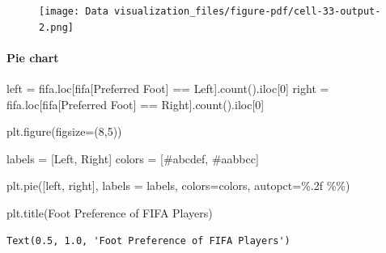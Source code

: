 \documentclass[
  letterpaper,
  DIV=11,
  numbers=noendperiod]{scrreprt}
\let\oldparagraph\paragraph
\renewcommand{\paragraph}[1]{\oldparagraph{#1}\mbox{}}
\newenvironment{Shaded}{\begin{snugshade}}{\end{snugshade}}
\newcommand{\DecValTok}[1]{\textcolor[rgb]{0.68,0.00,0.00}{#1}}
\newcommand{\NormalTok}[1]{\textcolor[rgb]{0.00,0.23,0.31}{#1}}
\newcommand{\OperatorTok}[1]{\textcolor[rgb]{0.37,0.37,0.37}{#1}}
\newcommand{\SpecialCharTok}[1]{\textcolor[rgb]{0.37,0.37,0.37}{#1}}
\newcommand{\StringTok}[1]{\textcolor[rgb]{0.13,0.47,0.30}{#1}}
\begin{document}
\begin{figure}[H]

{\centering \texttt{[image: Data visualization\_files/figure-pdf/cell-33-output-2.png]}

}

\end{figure}

\hypertarget{pie-chart}{%
\paragraph{Pie chart}\label{pie-chart}}

\begin{Shaded}
\begin{Highlighting}[]
\NormalTok{left }\OperatorTok{=}\NormalTok{ fifa.loc[fifa[}\StringTok{\textquotesingle{}Preferred Foot\textquotesingle{}}\NormalTok{] }\OperatorTok{==} \StringTok{\textquotesingle{}Left\textquotesingle{}}\NormalTok{].count().iloc[}\DecValTok{0}\NormalTok{]}
\NormalTok{right }\OperatorTok{=}\NormalTok{ fifa.loc[fifa[}\StringTok{\textquotesingle{}Preferred Foot\textquotesingle{}}\NormalTok{] }\OperatorTok{==} \StringTok{\textquotesingle{}Right\textquotesingle{}}\NormalTok{].count().iloc[}\DecValTok{0}\NormalTok{]}

\NormalTok{plt.figure(figsize}\OperatorTok{=}\NormalTok{(}\DecValTok{8}\NormalTok{,}\DecValTok{5}\NormalTok{))}

\NormalTok{labels }\OperatorTok{=}\NormalTok{ [}\StringTok{\textquotesingle{}Left\textquotesingle{}}\NormalTok{, }\StringTok{\textquotesingle{}Right\textquotesingle{}}\NormalTok{]}
\NormalTok{colors }\OperatorTok{=}\NormalTok{ [}\StringTok{\textquotesingle{}\#abcdef\textquotesingle{}}\NormalTok{, }\StringTok{\textquotesingle{}\#aabbcc\textquotesingle{}}\NormalTok{]}

\NormalTok{plt.pie([left, right], labels }\OperatorTok{=}\NormalTok{ labels, colors}\OperatorTok{=}\NormalTok{colors, autopct}\OperatorTok{=}\StringTok{\textquotesingle{}}\SpecialCharTok{\%.2f}\StringTok{ }\SpecialCharTok{\%\%}\StringTok{\textquotesingle{}}\NormalTok{)}

\NormalTok{plt.title(}\StringTok{\textquotesingle{}Foot Preference of FIFA Players\textquotesingle{}}\NormalTok{)}
\end{Highlighting}
\end{Shaded}

\begin{verbatim}
Text(0.5, 1.0, 'Foot Preference of FIFA Players')
\end{verbatim}
\end{document}
